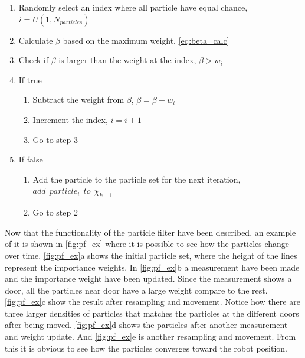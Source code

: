 \documentclass[Main]{subfiles}
\begin{document}
\begin{enumerate}
\item Randomly select an index where all particle have equal chance, $i = U(1,N_{particles})$ 
\item Calculate $\beta$ based on the maximum weight, \autoref{eq:beta_calc}
\item Check if $\beta$ is larger than the weight at the index, $\beta > w_i$
\item If true
\begin{enumerate}
	\item Subtract the weight from $\beta$, $\beta = \beta-w_i$
	\item Increment the index, $i = i+1$
	\item Go to step 3	
\end{enumerate}
\item If false
\begin{enumerate}
	\item Add the particle to the particle set for the next iteration, $add \:\: particle_i \:\: to \:\: \chi_{k+1}$
	\item Go to step 2
\end{enumerate}
\end{enumerate}
Now that the functionality of the particle filter have been described, an example of it is shown in \autoref{fig:pf_ex} where it is possible to see how the particles change over time.
\autoref{fig:pf_ex}a shows the initial particle set, where the height of the lines represent the importance weights. 
In \autoref{fig:pf_ex}b a measurement have been made and the importance weight have been updated.
Since the measurement shows a door, all the particles near door have a large weight compare to the rest.
\autoref{fig:pf_ex}c show the result after resampling and movement.
Notice how there are three larger densities of particles that matches the particles at the different doors after being moved.
\autoref{fig:pf_ex}d shows the particles after another measurement and weight update. And \autoref{fig:pf_ex}e is another resampling and movement.
From this it is obvious to see how the particles converges toward the robot position.
\end{document}
